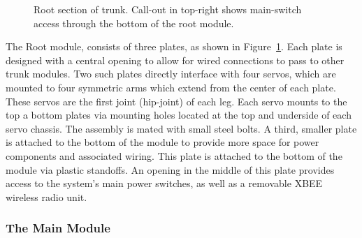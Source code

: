 				\begin{figure}[h!]
					\centering
					\caption{Root section of trunk. Call-out in top-right shows main-switch access through the bottom of the root module.}
					\label{fig::root_module}
				\end{figure}

				The Root module, consists of three plates, as shown in Figure~\ref{fig::root_module}. Each plate is designed with a central opening to allow for wired connections to pass to other trunk modules. Two such plates directly interface with four servos, which are mounted to four symmetric arms which extend from the center of each plate. These servos are the first joint (hip-joint) of each leg. Each servo mounts to the top a bottom plates via mounting holes located at the top and underside of each servo chassis. The assembly is mated with small steel bolts. A third, smaller plate is attached to the bottom of the module to provide more space for power components and associated wiring. This plate is attached to the bottom of the module via plastic standoffs. An opening in the middle of this plate provides access to the system's main power switches, as well as a removable XBEE wireless radio unit.

			\subsubsection{The Main Module}
		
